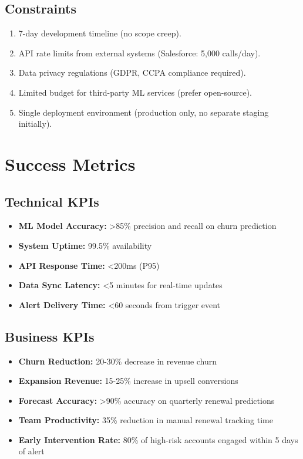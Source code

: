 \documentclass[12pt,a4paper]{article}
\begin{document}
\subsection{Constraints}
\begin{enumerate}
    \item 7-day development timeline (no scope creep).
    \item API rate limits from external systems (Salesforce: 5,000 calls/day).
    \item Data privacy regulations (GDPR, CCPA compliance required).
    \item Limited budget for third-party ML services (prefer open-source).
    \item Single deployment environment (production only, no separate staging initially).
\end{enumerate}

\section{Success Metrics}

\subsection{Technical KPIs}
\begin{itemize}
    \item \textbf{ML Model Accuracy:} >85\% precision and recall on churn prediction
    \item \textbf{System Uptime:} 99.5\% availability
    \item \textbf{API Response Time:} <200ms (P95)
    \item \textbf{Data Sync Latency:} <5 minutes for real-time updates
    \item \textbf{Alert Delivery Time:} <60 seconds from trigger event
\end{itemize}

\subsection{Business KPIs}
\begin{itemize}
    \item \textbf{Churn Reduction:} 20-30\% decrease in revenue churn
    \item \textbf{Expansion Revenue:} 15-25\% increase in upsell conversions
    \item \textbf{Forecast Accuracy:} >90\% accuracy on quarterly renewal predictions
    \item \textbf{Team Productivity:} 35\% reduction in manual renewal tracking time
    \item \textbf{Early Intervention Rate:} 80\% of high-risk accounts engaged within 5 days of alert
\end{itemize}
\end{document}
